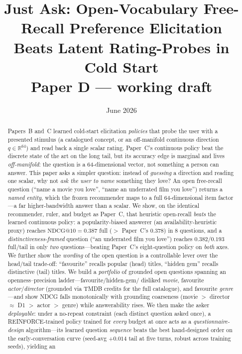 \documentclass[11pt]{article}
\title{\textbf{Just Ask: Open-Vocabulary Free-Recall Preference Elicitation\\Beats Latent Rating-Probes in Cold Start}\\[4pt]
\large Paper D --- working draft}
\author{}
\date{June 2026}
\makeatletter
\newcommand{\R}{\mathbb{R}}
\newcommand{\ndcg}{\mathrm{NDCG@}10}
\makeatother
\begin{document}
\maketitle

\begin{abstract}
\noindent Papers~B and~C learned cold-start elicitation \emph{policies} that probe the user with a presented stimulus
(a catalogued concept, or an off-manifold continuous direction $q\in\R^{64}$) and read back a single scalar rating.
Paper~C's continuous policy beat the discrete state of the art on the long tail, but its accuracy edge is marginal and
lives \emph{off-manifold}: the question is a $64$-dimensional vector, not something a person can answer. This paper asks
a simpler question: instead of \emph{guessing} a direction and reading one scalar, why not \emph{ask the user to name}
something they love? An open free-recall question (``name a movie you love'', ``name an underrated film you love'')
returns a \emph{named entity}, which the frozen recommender maps to a full $64$-dimensional item factor---a far
higher-bandwidth answer than a scalar. We show, on the identical recommender, ruler, and budget as Paper~C, that
heuristic open-recall \emph{beats} the learned continuous policy: a popularity-biased answerer (an availability-heuristic proxy) reaches
$\ndcg=0.387$ full ($>$ Paper~C's $0.378$) in $8$ questions, and a \emph{distinctiveness-framed} question (``an
underrated film you love'') reaches $0.382/0.193$ full/tail in only \emph{two} questions---beating Paper~C's
eight-question policy on \emph{both} axes. We further show the \emph{wording} of the open question is a controllable
lever over the head/tail trade-off: ``favourite'' recalls popular (head) titles, ``hidden gem'' recalls distinctive
(tail) titles. We build a \emph{portfolio} of grounded open questions spanning an openness--precision ladder---favourite/hidden-gem/
disliked \emph{movie}, favourite \emph{actor}/\emph{director} (grounded via TMDB credits for the full catalogue), and
favourite \emph{genre}---and show NDCG falls monotonically with grounding coarseness (movie $>$ director $\approx$ D1
$>$ actor $>$ genre) while answerability rises. We then make the asker \emph{deployable}: under a no-repeat
constraint (each distinct question asked once), a REINFORCE-trained policy trained for \emph{every} budget at once acts
as a \emph{questionnaire-design} algorithm---its learned question \emph{sequence} beats the best hand-designed order on
the early-conversation curve (seed-avg $+0.014$ tail at five turns, robust across training seeds), yielding an

\end{abstract}
\end{document}
